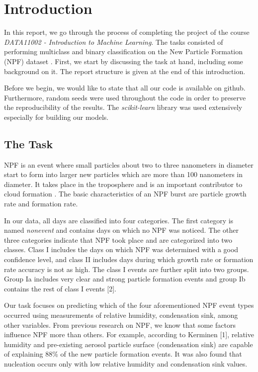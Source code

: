 \chapter{Introduction}


In this report, we go through the process of completing the project of the course \textit{DATA11002 - Introduction to Machine Learning}. The tasks consisted of performing multiclass and binary classification on the New Particle Formation (NPF) dataset \cite{npf_paper}. First, we start by discussing the task at hand, including some background on it. The report structure is given at the end of this introduction.

Before we begin, we would like to state that all our code is available on github. Furthermore, random seeds were used throughout the code in order to preserve the reproducibility of the results. The \textit{scikit-learn} \cite{sklearn} library was used extensively especially for building our models.

\section{The Task}

NPF is an event where small particles about two to three nanometers in diameter start to form into larger new particles which are more than 100 nanometers in diameter. It takes place in the troposphere and is an important contributor to cloud formation \cite{npf_paper}. The basic characteristics of an NPF burst are particle growth rate and formation rate.

In our data, all days are classified into four categories. The first category is named \textit{nonevent} and contains days on which no NPF was noticed. The other three categories indicate that NPF took place and are categorized into two classes. Class I includes the days on which NPF was determined with a good confidence level, and class II includes days during which growth rate or formation rate accuracy is not as high. The class I events are further split into two groups. Group Ia includes very clear and strong particle formation events and group Ib contains the rest of class I events [2].

Our task focuses on predicting which of the four aforementioned NPF event types occurred using measurements of relative humidity, condensation sink, among other variables. From previous research on NPF, we know that some factors influence NPF more than others. For example, according to Kerminen [1], relative humidity and pre-existing aerosol particle surface (condensation sink) are capable of explaining 88\% of the new particle formation events. It was also found that nucleation occurs only with low relative humidity and condensation sink values.

